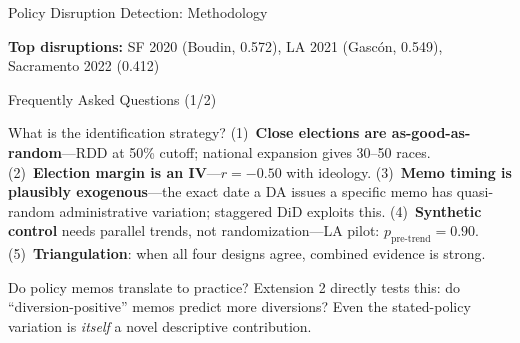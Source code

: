 \documentclass[aspectratio=169, 11pt]{beamer}
\begin{document}
\begin{frame}{Policy Disruption Detection: Methodology}
\vspace{8pt}

{\small\textbf{Top disruptions:} SF 2020 (Boudin, 0.572), LA 2021 (Gasc\'on, 0.549), Sacramento 2022 (0.412)}
\end{frame}

\begin{frame}{Frequently Asked Questions (1/2)}
\begin{block}{What is the identification strategy?}
{\small (1)~\textbf{Close elections are as-good-as-random}---RDD at 50\% cutoff; national expansion gives 30--50 races. (2)~\textbf{Election margin is an IV}---$r = -0.50$ with ideology. (3)~\textbf{Memo timing is plausibly exogenous}---the exact date a DA issues a specific memo has quasi-random administrative variation; staggered DiD exploits this. (4)~\textbf{Synthetic control} needs parallel trends, not randomization---LA pilot: $p_{\text{pre-trend}} = 0.90$. (5)~\textbf{Triangulation}: when all four designs agree, combined evidence is strong.}
\end{block}
\vspace{6pt}
\begin{block}{Do policy memos translate to practice?}
{\small Extension 2 directly tests this: do ``diversion-positive'' memos predict more diversions? Even the stated-policy variation is \emph{itself} a novel descriptive contribution.}
\end{block}
\end{frame}
\end{document}
